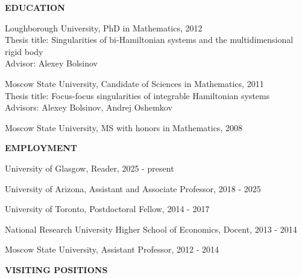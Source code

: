 \documentclass[a4paper, 12pt]{article}
\begin{document}
\par
\quad\par\bigskip
\textbf{{EDUCATION}}\par\smallskip
\begin{compactitem}
\item Loughborough University, PhD in Mathematics, 2012 \\
 Thesis title: {Singularities of bi-Hamiltonian systems and the multidimensional rigid body} \\  Advisor: Alexey Bolsinov 
\item   Moscow State University,  Candidate of Sciences in Mathematics,  2011 \\ 
Thesis title: {{Focus-focus singularities of integrable Hamiltonian systems}} \\
  Advisors: Alexey Bolsinov, Andrej Oshemkov
\item  Moscow State University, MS with honors in Mathematics, 2008
\end{compactitem}
\par\quad\par\smallskip
\textbf{EMPLOYMENT}\par\smallskip
\begin{compactitem}
\item University of Glasgow, Reader, 2025 - present
\item University of Arizona, Assistant and Associate Professor, 2018 - 2025
\item University of Toronto, Postdoctoral Fellow, 2014 - 2017 \
\item   National Research University Higher School of Economics, Docent, 2013 - 2014 

\item Moscow State University, Assistant Professor,  2012 - 2014\
 \end{compactitem}
 \par\quad\par\smallskip
\textbf{VISITING POSITIONS}\par\smallskip
\end{document}
